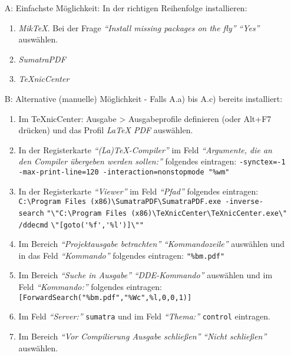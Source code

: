 \begin{enumerate}
	
	\item[A:] Einfachste Möglichkeit: In der richtigen Reihenfolge installieren:
	\begin{enumerate}
		\item \emph{MikTeX}. \newblock Bei der Frage \emph{"`Install missing packages on the fly"'} \emph{"`Yes"'} auswählen.
		\item \emph{SumatraPDF}
		\item \emph{TeXnicCenter}
	\end{enumerate}
	
	\item[B:] Alternative (manuelle) Möglichkeit - Falls A.a) bis A.c) bereits installiert:
		\begin{enumerate}
		
			\item Im TeXnicCenter: Ausgabe > Ausgabeprofile definieren (oder Alt+F7 drücken) und das Profil \emph{LaTeX \Pfeil PDF} auswählen.
			
			\item In der Registerkarte  \emph{"`(La)TeX-Compiler"'} im Feld \emph{"`Argumente, die an den Compiler übergeben werden sollen:"'} folgendes eintragen:\newline
			\verb|-synctex=-1 -max-print-line=120 -interaction=nonstopmode "%wm"|
			
			\item In der Registerkarte \emph{"`Viewer"'} im Feld \emph{"`Pfad"'} folgendes eintragen:\newline
				\verb|C:\Program Files (x86)\SumatraPDF\SumatraPDF.exe -inverse-search|
				\newline 
				\verb|"\"C:\Program Files (x86)\TeXnicCenter\TeXnicCenter.exe\" /ddecmd|
				\newline
				\verb|\"[goto('%f','%l')]\""|
			
			\item Im Bereich \emph{"`Projektausgabe betrachten"'} \emph{"`Kommandozeile"'} auswählen und in das Feld \emph{"`Kommando"'} folgendes eintragen:
			\newline
			\verb|"%bm.pdf"|
			
			\item Im Bereich \emph{"`Suche in Ausgabe"'} \emph{"`DDE-Kommando"'} auswählen und im Feld \emph{"`Kommando:"'} folgendes eintragen: 
				\newline
				\verb|[ForwardSearch("%bm.pdf","%Wc",%l,0,0,1)]|
			
			\item Im Feld \emph{"`Server:"'} \verb|sumatra| 
				und im Feld \emph{"`Thema:"'} \verb|control| eintragen.
			
			\item Im Bereich \emph{"`Vor Compilierung Ausgabe schließen"'} \emph{"`Nicht schließen"'} auswählen.
		\end{enumerate}
	
\end{enumerate}